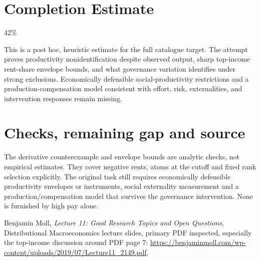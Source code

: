 \documentclass[11pt]{article}
\begin{document}
\section{Completion Estimate}
42\%

This is a post hoc, heuristic estimate for the full catalogue target.
The attempt proves productivity nonidentification despite observed output, sharp top-income rent-share envelope bounds, and what governance variation identifies under strong exclusions. Economically defensible social-productivity restrictions and a production-compensation model consistent with effort, risk, externalities, and intervention responses remain missing.

\section{Checks, remaining gap and source}
The derivative counterexample and envelope bounds are analytic checks, not empirical estimates. They cover negative rents, atoms at the cutoff and fixed rank selection explicitly. The original task still requires economically defensible productivity envelopes or instruments, social externality measurement and a production/compensation model that survives the governance intervention. None is furnished by high pay alone.

Benjamin Moll, \emph{Lecture 11: Good Research Topics and Open Questions}, Distributional Macroeconomics lecture slides, primary PDF inspected, especially the top-income discussion around PDF page 7:
\url{https://benjaminmoll.com/wp-content/uploads/2019/07/Lecture11_2149.pdf}.
\end{document}
